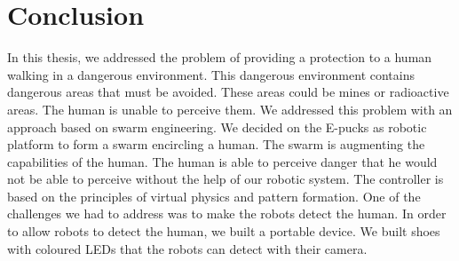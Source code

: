 \documentclass[oneside, a4paper, 12pt]{memoir}
\begin{document}
\chapter{Conclusion}
	\label{chap:conclusion}

	In this thesis, we addressed the problem of providing a protection to a human walking in a dangerous environment. This dangerous environment contains dangerous areas that must be avoided. These areas could be mines or radioactive areas. The human is unable to perceive them. We addressed this problem with an approach based on swarm engineering. We decided on the E-pucks \citep{mondada2009puck} as robotic platform to form a swarm encircling a human. The swarm is augmenting the capabilities of the human. The human is able to perceive danger that he would not be able to perceive without the help of our robotic system. The controller is based on the principles of virtual physics and pattern formation. One of the challenges we had to address was to make the robots detect the human. In order to allow robots to detect the human, we built a portable device. We built shoes with coloured LEDs that the robots can detect with their camera.
	
\end{document}
